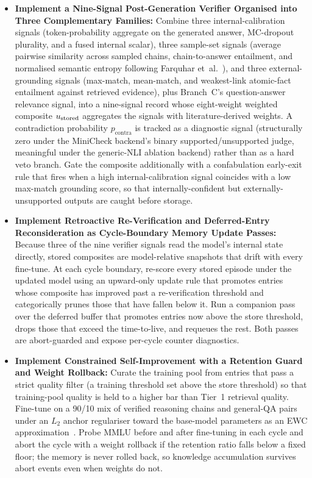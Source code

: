 \begin{itemize}
    \item \textbf{Implement a Nine-Signal Post-Generation Verifier Organised into Three Complementary Families:} Combine three internal-calibration signals (token-probability aggregate on the generated answer, MC-dropout plurality, and a fused internal scalar), three sample-set signals (average pairwise similarity across sampled chains, chain-to-answer entailment, and normalised semantic entropy following Farquhar et~al.~\cite{farquhar2024semantic}), and three external-grounding signals (max-match, mean-match, and weakest-link atomic-fact entailment against retrieved evidence), plus Branch~C's question-answer relevance signal, into a nine-signal record whose eight-weight weighted composite $u_{\text{stored}}$ aggregates the signals with literature-derived weights. A contradiction probability $p_{\text{contra}}$ is tracked as a diagnostic signal (structurally zero under the MiniCheck backend's binary supported/unsupported judge, meaningful under the generic-NLI ablation backend) rather than as a hard veto branch. Gate the composite additionally with a confabulation early-exit rule that fires when a high internal-calibration signal coincides with a low max-match grounding score, so that internally-confident but externally-unsupported outputs are caught before storage.

    \item \textbf{Implement Retroactive Re-Verification and Deferred-Entry Reconsideration as Cycle-Boundary Memory Update Passes:} Because three of the nine verifier signals read the model's internal state directly, stored composites are model-relative snapshots that drift with every fine-tune. At each cycle boundary, re-score every stored episode under the updated model using an upward-only update rule that promotes entries whose composite has improved past a re-verification threshold and categorically prunes those that have fallen below it. Run a companion pass over the deferred buffer that promotes entries now above the store threshold, drops those that exceed the time-to-live, and requeues the rest. Both passes are abort-guarded and expose per-cycle counter diagnostics.

    \item \textbf{Implement Constrained Self-Improvement with a Retention Guard and Weight Rollback:} Curate the training pool from entries that pass a strict quality filter (a training threshold set above the store threshold) so that training-pool quality is held to a higher bar than Tier~1 retrieval quality. Fine-tune on a 90/10 mix of verified reasoning chains and general-QA pairs under an $L_2$ anchor regulariser toward the base-model parameters as an EWC approximation~\cite{doi:10.1073/pnas.1611835114}. Probe MMLU before and after fine-tuning in each cycle and abort the cycle with a weight rollback if the retention ratio falls below a fixed floor; the memory is never rolled back, so knowledge accumulation survives abort events even when weights do not.


\end{itemize}

